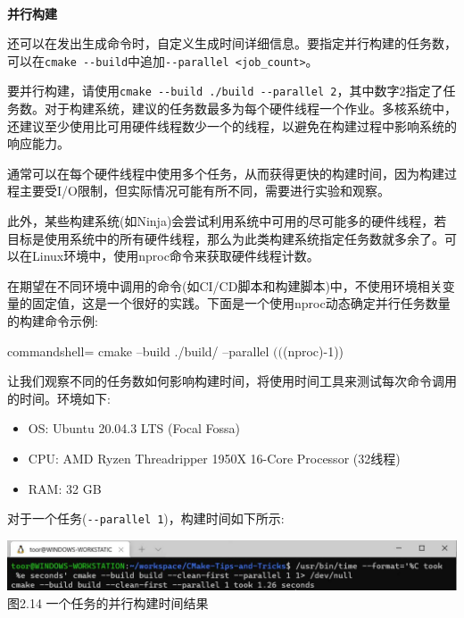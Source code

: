 \hspace*{\fill} \\ %
\noindent
\textbf{并行构建}

还可以在发出生成命令时，自定义生成时间详细信息。要指定并行构建的任务数，可以在\texttt{cmake -{}-build}中追加\texttt{-{}-parallel <job\_count>}。

要并行构建，请使用\texttt{cmake -{}-build ./build -{}-parallel 2}，其中数字2指定了任务数。对于构建系统，建议的任务数最多为每个硬件线程一个作业。多核系统中，还建议至少使用比可用硬件线程数少一个的线程，以避免在构建过程中影响系统的响应能力。

\begin{tcolorbox}[colback=webgreen!5!white,colframe=webgreen!75!black,title=Note]
通常可以在每个硬件线程中使用多个任务，从而获得更快的构建时间，因为构建过程主要受I/O限制，但实际情况可能有所不同，需要进行实验和观察。

此外，某些构建系统(如Ninja)会尝试利用系统中可用的尽可能多的硬件线程，若目标是使用系统中的所有硬件线程，那么为此类构建系统指定任务数就多余了。可以在Linux环境中，使用nproc命令来获取硬件线程计数。
\end{tcolorbox}

在期望在不同环境中调用的命令(如CI/CD脚本和构建脚本)中，不使用环境相关变量的固定值，这是一个很好的实践。下面是一个使用nproc动态确定并行任务数量的构建命令示例:

\begin{tcblisting}{commandshell={}}
cmake --build ./build/ --parallel $(($(nproc)-1))
\end{tcblisting}

让我们观察不同的任务数如何影响构建时间，将使用时间工具来测试每次命令调用的时间。环境如下:

\begin{itemize}
\item 
OS: Ubuntu 20.04.3 LTS (Focal Fossa)

\item 
CPU: AMD Ryzen Threadripper 1950X 16-Core Processor (32线程)

\item 
RAM: 32 GB
\end{itemize}

对于一个任务(\texttt{-{}-parallel 1})，构建时间如下所示:

\begin{center}
\includegraphics[width=1.\textwidth]{content/1/chapter2/images/14.jpg}\\
图2.14 一个任务的并行构建时间结果
\end{center}

